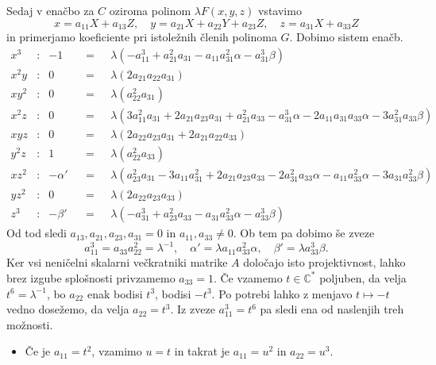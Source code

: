 \documentclass[mat1]{fmfdelo}
\numberwithin{equation}{section}
\newcommand{\CM}{\mathbb C ^*}
\newcommand{\inv}{^{-1}}
\theoremstyle{definition}
\begin{document}
\begin{dokaz}
    Sedaj v enačbo za $C$ oziroma polinom $\lambda F(x,y,z)$ vstavimo 
    \[
        x = a_{11}X + a_{13}Z, \quad y = a_{21}X + a_{22}Y + a_{23}Z, \quad z = a_{31}X + a_{33}Z 
    \]
    in primerjamo koeficiente pri istoležnih členih polinoma $G$.
    Dobimo sistem enačb.
    \begin{align*}
        x^3 &: & -1 && = \text{ }& \lambda (-a_{11}^3 + a_{21}^2 a_{31} - a_{11} a_{31}^2 \alpha - a_{31}^3 \beta) \\
        x^2y &: & 0 && = \text{ }& \lambda (2 a_{21} a_{22} a_{31}) \\
        xy^2 &: & 0 && = \text{ }& \lambda (a_{22}^2 a_{31}) \\
        x^2z &: & 0 && = \text{ }& \lambda (3 a_{11}^2 a_{31} + 2 a_{21} a_{23} a_{31} + a_{21}^2 a_{33} - 
        a_{31}^3 \alpha - 2 a_{11} a_{31} a_{33} \alpha - 3 a_{31}^2 a_{33} \beta) \\
        xyz  &: & 0 && = \text{ }& \lambda (2 a_{22} a_{23} a_{31} + 2 a_{21} a_{22} a_{33}) \\
        y^2z &: & 1 && = \text{ }& \lambda (a_{22}^2 a_{33}) \\
        xz^2 &: & -\alpha' && = \text{ }& \lambda (a_{23}^2 a_{31} - 3 a_{11} a_{31}^2 + 2 a_{21} a_{23} a_{33} - 
        2 a_{31}^2 a_{33} \alpha - a_{11} a_{33}^2 \alpha - 3 a_{31} a_{33}^2 \beta) \\
        yz^2 &: & 0 && = \text{ }& \lambda (2 a_{22} a_{23} a_{33} ) \\
        z^3 &: & -\beta' && = \text{ }& \lambda (-a_{31}^3 + a_{23}^2 a_{33} - a_{31} a_{33}^2 \alpha - a_{33}^3 \beta)
    \end{align*}
    Od tod sledi $a_{13}, a_{21}, a_{23}, a_{31} = 0$ in $a_{11}, a_{33} \neq 0$. Ob tem pa dobimo še zveze
    \[
        a_{11}^3 = a_{33}a_{22}^2 = \lambda\inv, \quad \alpha' = \lambda a_{11}a_{33}^2 \alpha, \quad \beta' = \lambda a_{33}^3 \beta.
    \]
    Ker vsi neničelni skalarni večkratniki matrike $A$ določajo isto projektivnost, lahko brez izgube splošnosti privzamemo $a_{33} = 1$. Če vzamemo $t \in \CM$ poljuben, da velja $t^6 = \lambda\inv$, bo $a_{22}$ enak bodisi $t^3$, bodisi $-t^3$. Po potrebi lahko z menjavo $t \mapsto -t$ vedno dosežemo, da velja $a_{22} = t^3$. Iz zveze $a_{11}^3 = t^6$ pa sledi ena od naslenjih treh možnosti.
    \begin{itemize}
        \item Če je $a_{11} = t^2$, vzamimo $u = t$ in takrat je $a_{11} = u^2$ in $a_{22} = u^3$.

\end{itemize}
\end{dokaz}
\end{document}
